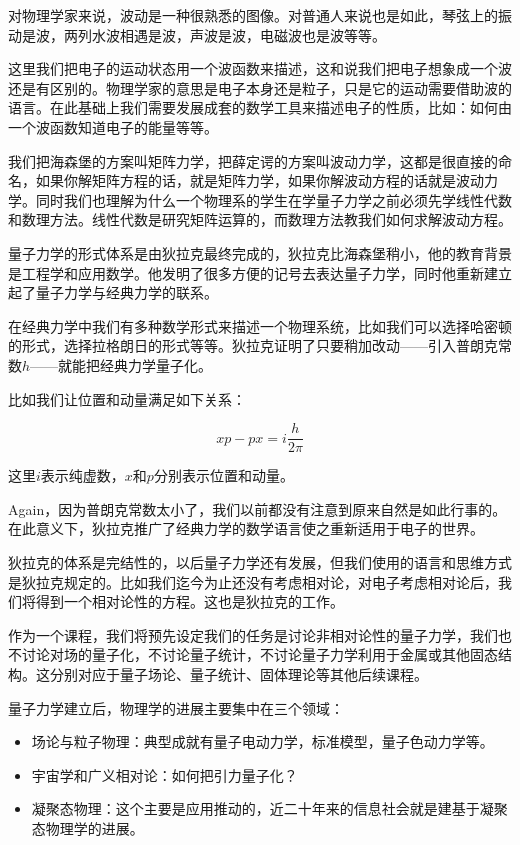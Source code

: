 对物理学家来说，波动是一种很熟悉的图像。对普通人来说也是如此，琴弦上的振动是波，两列水波相遇是波，声波是波，电磁波也是波等等。

这里我们把电子的运动状态用一个波函数来描述，这和说我们把电子想象成一个波还是有区别的。物理学家的意思是电子本身还是粒子，只是它的运动需要借助波的语言。在此基础上我们需要发展成套的数学工具来描述电子的性质，比如：如何由一个波函数知道电子的能量等等。

我们把海森堡的方案叫矩阵力学，把薛定谔的方案叫波动力学，这都是很直接的命名，如果你解矩阵方程的话，就是矩阵力学，如果你解波动方程的话就是波动力学。同时我们也理解为什么一个物理系的学生在学量子力学之前必须先学线性代数和数理方法。线性代数是研究矩阵运算的，而数理方法教我们如何求解波动方程。

量子力学的形式体系是由狄拉克最终完成的，狄拉克比海森堡稍小，他的教育背景是工程学和应用数学。他发明了很多方便的记号去表达量子力学，同时他重新建立起了量子力学与经典力学的联系。

在经典力学中我们有多种数学形式来描述一个物理系统，比如我们可以选择哈密顿的形式，选择拉格朗日的形式等等。狄拉克证明了只要稍加改动——引入普朗克常数$h$——就能把经典力学量子化。

比如我们让位置和动量满足如下关系：

\begin{equation}
xp - px = i \frac{h}{2 \pi}
\end{equation}

这里$i$表示纯虚数，$x$和$p$分别表示位置和动量。

Again，因为普朗克常数太小了，我们以前都没有注意到原来自然是如此行事的。在此意义下，狄拉克推广了经典力学的数学语言使之重新适用于电子的世界。

狄拉克的体系是完结性的，以后量子力学还有发展，但我们使用的语言和思维方式是狄拉克规定的。比如我们迄今为止还没有考虑相对论，对电子考虑相对论后，我们将得到一个相对论性的方程。这也是狄拉克的工作。

作为一个课程，我们将预先设定我们的任务是讨论非相对论性的量子力学，我们也不讨论对场的量子化，不讨论量子统计，不讨论量子力学利用于金属或其他固态结构。这分别对应于量子场论、量子统计、固体理论等其他后续课程。

量子力学建立后，物理学的进展主要集中在三个领域：

\begin{itemize}

\item 场论与粒子物理：典型成就有量子电动力学，标准模型，量子色动力学等。

\item 宇宙学和广义相对论：如何把引力量子化？

\item 凝聚态物理：这个主要是应用推动的，近二十年来的信息社会就是建基于凝聚态物理学的进展。

\end{itemize}

